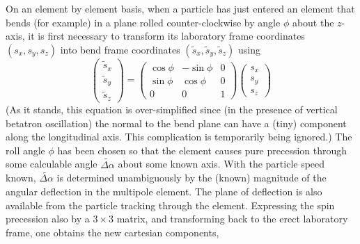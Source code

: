 \documentclass[]{article}
\begin{document}
On an element by element basis, when a particle 
has just entered an element that bends (for example) in a
plane rolled counter-clockwise by angle $\phi$ about 
the $z$-axis,
it is first necessary to transform its laboratory frame 
coordinates $(s_x,s_y,s_z)$ into bend frame coordinates
$(\tilde s_x,\tilde s_y,\tilde s_z)$ using
%
\begin{equation}
\begin{pmatrix} \tilde s_x \\ \tilde s_y \\ \tilde s_z \end{pmatrix}
 =
\begin{pmatrix} 
 \cos\phi  & -\sin\phi  &  0 \\
 \sin\phi  &  \cos\phi  &  0 \\
    0      &     0      &  1
\end{pmatrix}
\begin{pmatrix} s_x \\ s_y \\ s_z \end{pmatrix}
\label{eq:SpinPrecess.0p}
\end{equation}
%
(As it stands, this equation is over-simplified since (in the
presence of vertical betatron oscillation) the normal to the
bend plane can have a (tiny) component along the longitudinal
axis. This complication is temporarily being ignored.)
The roll angle $\phi$ has been chosen so that the
element causes pure precession through 
some calculable angle $\widetilde{\Delta\alpha}$ about 
some known axis. With the particle speed known, 
$\widetilde{\Delta\alpha}$ is determined unambiguously by
the (known) magnitude of the angular deflection in the multipole 
element. The plane
of deflection is also available from the particle tracking
through the element.
Expressing the spin precession also by a $3\times3$ matrix, 
and transforming back to the erect laboratory frame,
one obtains the new cartesian components,
%
\end{document}
